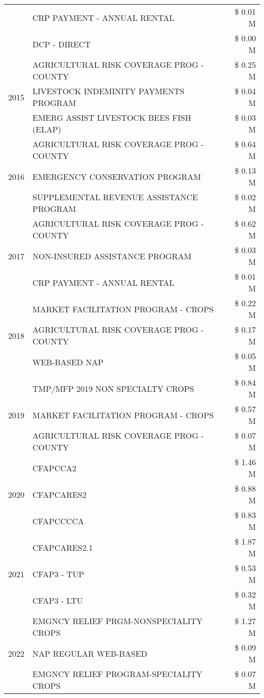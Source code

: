 \begin{tabular}{llr}
 & CRP PAYMENT - ANNUAL RENTAL & \$ 0.01 M \\
 & DCP - DIRECT & \$ 0.00 M \\
\cline{1-3}
\multirow[t]{3}{*}{2015} & AGRICULTURAL RISK COVERAGE PROG - COUNTY & \$ 0.25 M \\
 & LIVESTOCK INDEMINITY PAYMENTS PROGRAM & \$ 0.04 M \\
 & EMERG ASSIST LIVESTOCK BEES FISH (ELAP) & \$ 0.03 M \\
\cline{1-3}
\multirow[t]{3}{*}{2016} & AGRICULTURAL RISK COVERAGE PROG - COUNTY & \$ 0.64 M \\
 & EMERGENCY CONSERVATION PROGRAM & \$ 0.13 M \\
 & SUPPLEMENTAL REVENUE ASSISTANCE PROGRAM & \$ 0.02 M \\
\cline{1-3}
\multirow[t]{3}{*}{2017} & AGRICULTURAL RISK COVERAGE PROG - COUNTY & \$ 0.62 M \\
 & NON-INSURED ASSISTANCE PROGRAM & \$ 0.03 M \\
 & CRP PAYMENT - ANNUAL RENTAL & \$ 0.01 M \\
\cline{1-3}
\multirow[t]{3}{*}{2018} & MARKET FACILITATION PROGRAM - CROPS & \$ 0.22 M \\
 & AGRICULTURAL RISK COVERAGE PROG - COUNTY & \$ 0.17 M \\
 & WEB-BASED NAP & \$ 0.05 M \\
\cline{1-3}
\multirow[t]{3}{*}{2019} & TMP/MFP 2019 NON SPECIALTY CROPS & \$ 0.84 M \\
 & MARKET FACILITATION PROGRAM - CROPS & \$ 0.57 M \\
 & AGRICULTURAL RISK COVERAGE PROG - COUNTY & \$ 0.07 M \\
\cline{1-3}
\multirow[t]{3}{*}{2020} & CFAPCCA2 & \$ 1.46 M \\
 & CFAPCARES2 & \$ 0.88 M \\
 & CFAPCCCCA & \$ 0.83 M \\
\cline{1-3}
\multirow[t]{3}{*}{2021} & CFAPCARES2.1 & \$ 1.87 M \\
 & CFAP3 - TUP & \$ 0.53 M \\
 & CFAP3 - LTU & \$ 0.32 M \\
\cline{1-3}
\multirow[t]{3}{*}{2022} & EMGNCY RELIEF PRGM-NONSPECIALITY CROPS & \$ 1.27 M \\
 & NAP REGULAR WEB-BASED & \$ 0.09 M \\
 & EMGNCY RELIEF PROGRAM-SPECIALITY CROPS & \$ 0.07 M \\
\cline{1-3}
\bottomrule
\end{tabular}
